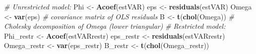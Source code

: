 \documentclass[
  12pt,
]{book}
\newenvironment{Shaded}{\begin{snugshade}}{\end{snugshade}}
\newcommand{\CommentTok}[1]{\textcolor[rgb]{0.56,0.35,0.01}{\textit{#1}}}
\newcommand{\FunctionTok}[1]{\textcolor[rgb]{0.13,0.29,0.53}{\textbf{#1}}}
\newcommand{\NormalTok}[1]{#1}
\newcommand{\OtherTok}[1]{\textcolor[rgb]{0.56,0.35,0.01}{#1}}
\theoremstyle{definition}
\theoremstyle{definition}
\theoremstyle{definition}
\theoremstyle{definition}
\theoremstyle{remark}
\begin{document}
\begin{Shaded}
\begin{Highlighting}[]
\CommentTok{\# Unrestricted model:}
\NormalTok{Phi }\OtherTok{\textless{}{-}} \FunctionTok{Acoef}\NormalTok{(estVAR)}
\NormalTok{eps }\OtherTok{\textless{}{-}} \FunctionTok{residuals}\NormalTok{(estVAR)}
\NormalTok{Omega }\OtherTok{\textless{}{-}} \FunctionTok{var}\NormalTok{(eps) }\CommentTok{\# covariance matrix of OLS residuals}
\NormalTok{B }\OtherTok{\textless{}{-}} \FunctionTok{t}\NormalTok{(}\FunctionTok{chol}\NormalTok{(Omega)) }\CommentTok{\# Cholesky decomposition of Omega (lower triangular)}
\CommentTok{\# Restricted model:}
\NormalTok{Phi\_restr }\OtherTok{\textless{}{-}} \FunctionTok{Acoef}\NormalTok{(estVARrestr)}
\NormalTok{eps\_restr }\OtherTok{\textless{}{-}} \FunctionTok{residuals}\NormalTok{(estVARrestr)}
\NormalTok{Omega\_restr }\OtherTok{\textless{}{-}} \FunctionTok{var}\NormalTok{(eps\_restr)}
\NormalTok{B\_restr }\OtherTok{\textless{}{-}} \FunctionTok{t}\NormalTok{(}\FunctionTok{chol}\NormalTok{(Omega\_restr))}


\end{Highlighting}
\end{Shaded}
\end{document}
